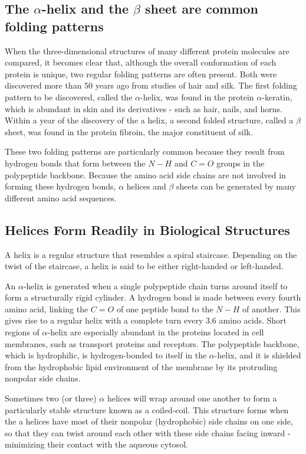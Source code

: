 \subsection{The $\alpha$-helix and the $\beta$ sheet are common folding patterns}

When the three-dimensional structures of many different protein molecules
are compared, it becomes clear that, although the overall
conformation of each protein is unique, two regular folding patterns are
often present. Both were discovered more than 50 years ago from studies
of hair and silk. The first folding pattern to be discovered, called the
$\alpha$-helix, was found in the protein $\alpha$-keratin, which is abundant in skin and
its derivatives - such as hair, nails, and horns. Within a year of the discovery
of the a helix, a second folded structure, called a $\beta$ sheet, was found
in the protein fibroin, the major constituent of silk.

These two folding patterns are particularly common because they result
from hydrogen bonds that form between the $N-H$ and $C=O$ groups in
the polypeptide backbone. Because the amino acid side chains are not
involved in forming these hydrogen bonds, $\alpha$ helices and $\beta$ sheets can
be generated by many different amino acid sequences.

\subsection{Helices Form Readily in Biological Structures}

A helix is a regular structure that resembles a spiral staircase.
Depending on the twist of the staircase, a helix is said to be either
right-handed or left-handed.

An $\alpha$-helix is generated when a single polypeptide chain turns around
itself to form a structurally rigid cylinder. A hydrogen bond is made
between every fourth amino acid, linking the $C=O$ of one peptide bond to
the $N-H$ of another. This gives rise to a regular helix
with a complete turn every 3.6 amino acids.
Short regions of $\alpha$-helix are especially abundant in the proteins located
in cell membranes, such as transport proteins and receptors.
The polypeptide backbone, which is hydrophilic, is hydrogen-bonded to itself in
the $\alpha$-helix, and it is shielded
from the hydrophobic lipid environment of the membrane by its protruding nonpolar side chains.

Sometimes two (or three) $\alpha$ helices will wrap around one another to
form a particularly stable structure known as a coiled-coil. This structure
forms when the a helices have most of their nonpolar (hydrophobic)
side chains on one side, so that they can twist around each other with
these side chains facing inward - minimizing their contact with the aqueous cytosol.

